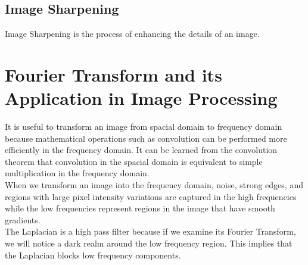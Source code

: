 \documentclass[a4paper]{article}
\begin{document}
\subsection{Image Sharpening}

Image Sharpening is the process of enhancing the details of an image. 


\section{Fourier Transform and its Application in Image Processing}

It is useful to transform an image from spacial domain to frequency domain because mathematical operations such as convolution can be 
performed more efficiently in the frequency domain. 
It can be learned from the convolution theorem that convolution in the spacial domain is equivalent to simple multiplication in the 
frequency domain. \\ 

When we transform an image into the frequency domain, noise, strong edges, and regions with large pixel intensity variations are 
captured in the high frequencies while the low frequencies represent regions in the image that have smooth gradients. \\

The Laplacian is a high pass filter because if we examine its Fourier Transform, 
we will notice a dark realm around the low frequency region. 
This implies that the Laplacian blocks low frequency components. \\




\pagebreak


 
\end{document}
